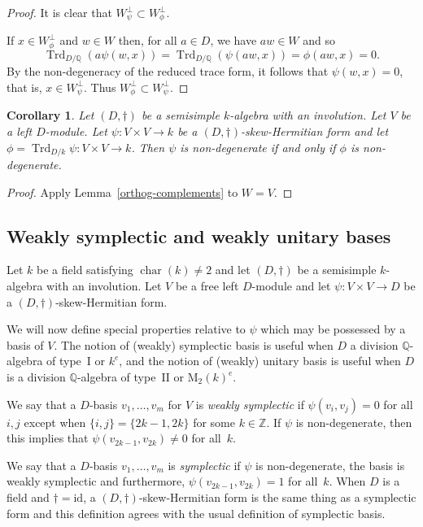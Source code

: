\documentclass[11pt]{article}
\numberwithin{equation}{section}
\newcommand{\bQ}{\mathbb{Q}}
\newcommand{\bZ}{\mathbb{Z}}
\newcommand{\rM}{\mathrm{M}}
\DeclareMathOperator{\characteristic}{char}
\DeclareMathOperator{\Trd}{Trd}
\newcommand{\id}{\mathrm{id}}
\newcommand{\defterm}[1]{\emph{#1}}
\newtheorem{corollary}[lemma]{Corollary}
\begin{document}
\begin{proof}
It is clear that $W_\psi^\perp \subset W_\phi^\perp$.

If $x \in W_\phi^\perp$ and $w \in W$ then, for all $a \in D$, we have $aw \in W$ and so
\[
\Trd_{D/\bQ}(a\psi(w,x)) = \Trd_{D/\bQ}(\psi(aw,x)) = \phi(aw,x) = 0.
\]
By the non-degeneracy of the reduced trace form, it follows that $\psi(w,x) = 0$, that is, $x \in W_\psi^\perp$.
Thus $W_\phi^\perp \subset W_\psi^\perp$.
\end{proof}

\begin{corollary} \label{tr-non-deg}
Let $(D, \dag)$ be a semisimple $k$-algebra with an involution.
Let $V$ be a left $D$-module.
Let $\psi \colon V \times V \to k$ be a $(D,\dag)$-skew-Hermitian form and let $\phi = \Trd_{D/k} \psi \colon V \times V \to k$.
Then $\psi$ is non-degenerate if and only if $\phi$ is non-degenerate.
\end{corollary}

\begin{proof}
Apply Lemma~\ref{orthog-complements} to $W = V$.
\end{proof}

\subsection{Weakly symplectic and weakly unitary bases} \label{subsec:unitary-bases}

Let $k$ be a field satisfying $\characteristic(k) \neq 2$ and let $(D,\dag)$ be a semisimple $k$-algebra with an involution.
Let $V$ be a free left $D$-module and let $\psi \colon V \times V \to D$ be a $(D,\dag)$-skew-Hermitian form.

We will now define special properties relative to $\psi$ which may be possessed by a basis of $V$. The notion of (weakly) symplectic basis is useful when $D$ a division $\bQ$\nobreakdash-al\-gebra of type~I or $k^e$, and the notion of (weakly) unitary basis is useful when $D$ is a division $\bQ$-algebra of type~II or $\rM_2(k)^e$.

We say that a $D$-basis $v_1, \dotsc, v_m$ for $V$ is \defterm{weakly symplectic} if $\psi(v_i, v_j) = 0$ for all $i, j$ except when $\{i,j\} = \{2k-1,2k\}$ for some $k \in \bZ$.
If $\psi$ is non-degenerate, then this implies that $\psi(v_{2k-1}, v_{2k}) \neq 0$ for all~$k$.

We say that a $D$-basis $v_1, \dotsc, v_m$ is \defterm{symplectic} if $\psi$ is non-degenerate, the basis is weakly symplectic and furthermore, $\psi(v_{2k-1}, v_{2k}) = 1$ for all~$k$.
When $D$ is a field and $\dag=\id$, a $(D,\dag)$-skew-Hermitian form is the same thing as a symplectic form and this definition agrees with the usual definition of symplectic basis.
\end{document}
